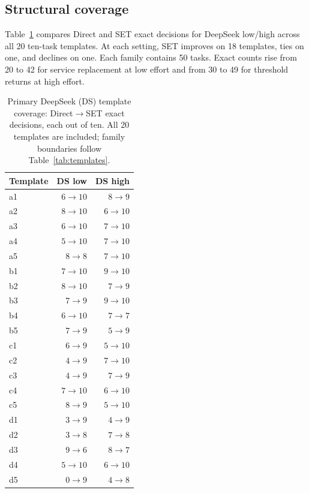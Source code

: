\documentclass[11pt]{article}
\begin{document}
\subsection{Structural coverage}
Table~\ref{tab:templates-results} compares Direct and SET exact decisions for DeepSeek low/high across all 20 ten-task templates. At each setting, SET improves on 18 templates, ties on one, and declines on one. Each family contains 50 tasks. Exact counts rise from 20 to 42 for service replacement at low effort and from 30 to 49 for threshold returns at high effort.

\begin{table}[!t]
\centering\small
\begin{tabular}{@{}lrr@{}}
\toprule
Template & DS low & DS high\\
\midrule
a1 & $6\to10$ & $8\to9$\\
a2 & $8\to10$ & $6\to10$\\
a3 & $6\to10$ & $7\to10$\\
a4 & $5\to10$ & $7\to10$\\
a5 & $8\to8$ & $7\to10$\\
\midrule
b1 & $7\to10$ & $9\to10$\\
b2 & $8\to10$ & $7\to9$\\
b3 & $7\to9$ & $9\to10$\\
b4 & $6\to10$ & $7\to7$\\
b5 & $7\to9$ & $5\to9$\\
\midrule
c1 & $6\to9$ & $5\to10$\\
c2 & $4\to9$ & $7\to10$\\
c3 & $4\to9$ & $7\to9$\\
c4 & $7\to10$ & $6\to10$\\
c5 & $8\to9$ & $5\to10$\\
\midrule
d1 & $3\to9$ & $4\to9$\\
d2 & $3\to8$ & $7\to8$\\
d3 & $9\to6$ & $8\to7$\\
d4 & $5\to10$ & $6\to10$\\
d5 & $0\to9$ & $4\to8$\\
\bottomrule
\end{tabular}
\caption{Primary DeepSeek (DS) template coverage: Direct$\to$SET exact decisions, each out of ten. All 20 templates are included; family boundaries follow Table~\ref{tab:templates}.}
\label{tab:templates-results}
\end{table}
\end{document}
